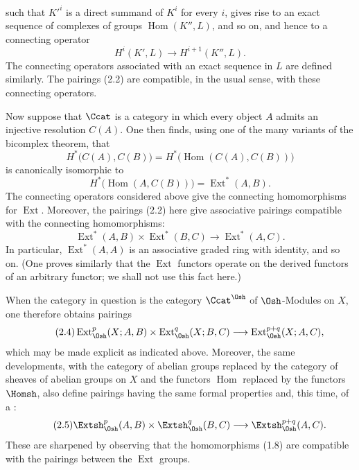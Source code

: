 such that $K'^{i}$ is a direct summand of $K^{i}$ for every $i$, gives rise to an
exact sequence of complexes of groups $\operatorname{Hom}(K'',L)$, and so on,
and hence to a connecting operator
\[
  H^{i}(K',L)\longrightarrow H^{i+1}(K'',L).
\]
The connecting operators associated with an exact sequence in $L$ are defined
similarly. The pairings (2.2) are compatible, in the usual sense, with these
connecting operators.

Now suppose that $\Ccat$ is a category in which every object $A$ admits an
injective resolution $C(A)$. One then finds, using one of the many variants of
the bicomplex theorem, that
\[
  H^{*}\bigl(C(A),C(B)\bigr)
  =H^{*}\bigl(\operatorname{Hom}(C(A),C(B))\bigr)
\]
is canonically isomorphic to
\[
  H^{*}\bigl(\operatorname{Hom}(A,C(B))\bigr)
  =\operatorname{Ext}^{*}(A,B).
\]
The connecting operators considered above give the connecting homomorphisms for
$\operatorname{Ext}$. Moreover, the pairings (2.2) here give associative
pairings compatible with the connecting homomorphisms:
\begin{equation}\tag{2.3}
  \operatorname{Ext}^{*}(A,B)\times\operatorname{Ext}^{*}(B,C)
  \longrightarrow\operatorname{Ext}^{*}(A,C).
\end{equation}
In particular, $\operatorname{Ext}^{*}(A,A)$ is an associative graded ring with
identity, and so on. (One proves similarly that the $\operatorname{Ext}$
functors operate on the derived functors of an arbitrary functor; we shall not
use this fact here.)

When the category in question is the category $\Ccat^{\Osh}$ of
$\Osh$-Modules on $X$, one therefore obtains pairings
\begin{equation}\tag{2.4}
  \operatorname{Ext}_{\Osh}^{p}(X;A,B)
  \times\operatorname{Ext}_{\Osh}^{q}(X;B,C)
  \longrightarrow\operatorname{Ext}_{\Osh}^{p+q}(X;A,C),
\end{equation}
which may be made explicit as indicated above. Moreover, the same developments,
with the category of abelian groups replaced by the category of sheaves of
abelian groups on $X$ and the functors $\operatorname{Hom}$ replaced by the
functors $\Homsh$, also define pairings having the same formal properties and,
this time, of a :
\begin{equation}\tag{2.5}
  \Extsh_{\Osh}^{p}(A,B)\times\Extsh_{\Osh}^{q}(B,C)
  \longrightarrow\Extsh_{\Osh}^{p+q}(A,C).
\end{equation}
These are sharpened by observing that the homomorphisms (1.8) are compatible
with the pairings between the $\operatorname{Ext}$ groups.

